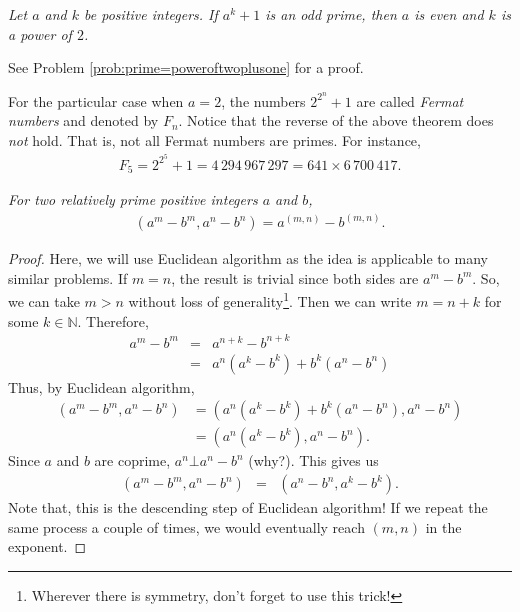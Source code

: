 \documentclass{subfile}
\begin{document}
	\begin{theorem}\slshape\label{thm:primec}
		Let $a$ and $k$ be positive integers. If $a^k+1$ is an odd prime, then $a$ is even and $k$ is a power of $2$.
	\end{theorem}

	See Problem \ref{prob:prime=poweroftwoplusone} for a proof.

	\begin{remark}
		For the particular case when $a=2$, the numbers $2^{2^n}+1$ are called \textit{Fermat numbers} and denoted by $F_n$. Notice that the reverse of the above theorem does \textit{not} hold. That is, not all Fermat numbers are primes. For instance,
		\begin{align*}
			F_5 = 2^{2^5}+1 = 4\, 294\, 967\, 297 = 641 \times 6\, 700\, 417.
		\end{align*}
	\end{remark}

	\begin{theorem}\slshape
		For two relatively prime positive integers $a$ and $b$,
		\begin{align*}
			(a^m-b^m,a^n-b^n)=a^{(m,n)}-b^{(m,n)}.
		\end{align*}
	\end{theorem}

	\begin{proof}
		Here, we will use Euclidean algorithm as the idea is applicable to many similar problems. If $m=n$, the result is trivial since both sides are $a^m-b^m$. So, we can take $m>n$ without loss of generality\footnote{Wherever there is symmetry, don't forget to use this trick!}. Then we can write $m=n+k$ for some $k\in\mathbb{N}$. Therefore,
		\begin{eqnarray*}
			a^m-b^m & = & a^{n+k}-b^{n+k}\\
			& = & a^n(a^k-b^k)+b^k(a^n-b^n)
		\end{eqnarray*}
		Thus, by Euclidean algorithm,
		\begin{align*}
			(a^m-b^m,a^n-b^n) & = (a^n(a^k-b^k)+b^k(a^n-b^n),a^n-b^n)\\
			&=(a^n(a^k-b^k),a^n-b^n).
		\end{align*}
		Since $a$ and $b$ are coprime, $a^n\bot a^n-b^n$ (why?). This gives us
		\begin{eqnarray*}
			(a^m-b^m,a^n-b^n) & = & (a^n-b^n,a^k-b^k).
		\end{eqnarray*}
		Note that, this is the descending step of Euclidean algorithm! If we repeat the same process a couple of times, we would eventually reach $(m,n)$ in the exponent.
	\end{proof}
\end{document}
